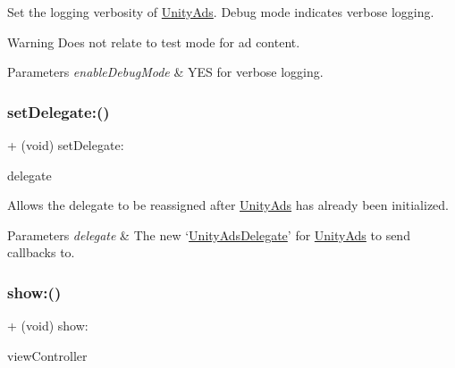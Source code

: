Set the logging verbosity of {\ttfamily \mbox{\hyperlink{interface_unity_ads}{Unity\+Ads}}}. Debug mode indicates verbose logging. \begin{DoxyWarning}{Warning}
Does not relate to test mode for ad content. 
\end{DoxyWarning}

\begin{DoxyParams}{Parameters}
{\em enable\+Debug\+Mode} & {\ttfamily Y\+ES} for verbose logging. \\
\hline
\end{DoxyParams}
\mbox{\label{interface_unity_ads_af3fd5286dccef9e7f0557694cc0d747b}} 
\subsubsection{\texorpdfstring{setDelegate:()}{setDelegate:()}}
{\footnotesize\ttfamily + (void) set\+Delegate\+: \begin{DoxyParamCaption}\item[{(id$<$ \mbox{\hyperlink{protocol_unity_ads_delegate-p}{Unity\+Ads\+Delegate}} $>$)}]{delegate }\end{DoxyParamCaption}}

Allows the delegate to be reassigned after \mbox{\hyperlink{interface_unity_ads}{Unity\+Ads}} has already been initialized.


\begin{DoxyParams}{Parameters}
{\em delegate} & The new `\mbox{\hyperlink{protocol_unity_ads_delegate-p}{Unity\+Ads\+Delegate}}' for \mbox{\hyperlink{interface_unity_ads}{Unity\+Ads}} to send callbacks to. \\
\hline
\end{DoxyParams}
\mbox{\label{interface_unity_ads_a9246ffcfb9c831021f57cf81c21d3757}} 
\subsubsection{\texorpdfstring{show:()}{show:()}}
{\footnotesize\ttfamily + (void) show\+: \begin{DoxyParamCaption}\item[{(U\+I\+View\+Controller $\ast$)}]{view\+Controller }\end{DoxyParamCaption}}

